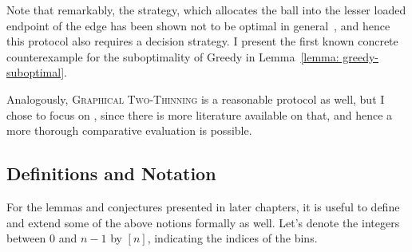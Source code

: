 Note that remarkably, the \Greedy strategy, which allocates the ball into the lesser loaded endpoint of the edge has been shown not to be optimal in general~\cite{bansal2021twochoicegraphical}, and hence this protocol also requires a decision strategy. I present the first known concrete counterexample for the suboptimality of Greedy in Lemma~\ref{lemma: greedy-suboptimal}.


Analogously, \textsc{Graphical Two-Thinning} is a reasonable protocol as well, but I chose to focus on \GraphicalTwoChoice, since there is more literature available on that, and hence a more thorough comparative evaluation is possible.\\

\subsection{Definitions and Notation} \label{notation}

For the lemmas and conjectures presented in later chapters, it is useful to define and extend some of the above notions formally as well. Let's denote the integers between $0$ and $n-1$ by $[n]$, indicating the indices of the bins.

